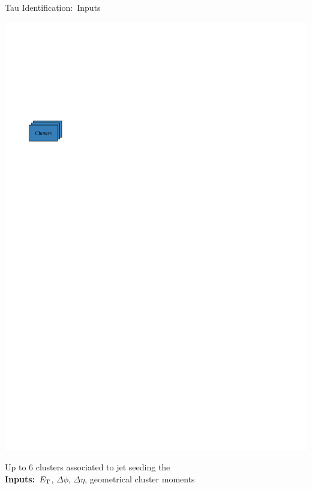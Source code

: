 \documentclass[11pt, xcolor={dvipsnames}, aspectratio=169]{beamer}
\begin{document}
\begin{frame}{Tau Identification:\ Inputs}
\begin{minipage}[c][2.2cm][c]{0.25\textwidth}
    \includegraphics[scale=1]{tauid/cluster_icon}
  \end{minipage}%
  \begin{minipage}[c][2.2cm][c]{0.75\textwidth}
    Up to 6 clusters associated to jet seeding the \tauhadvis\\[0.5\baselineskip]
    \textbf{Inputs:}\ $E_{\text{T}}$, $\Delta \phi$, $\Delta \eta$, geometrical cluster
    moments
  \end{minipage}
\end{frame}



\end{document}
